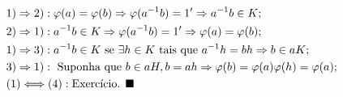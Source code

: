 \documentclass[algebra_notes.tex]{subfiles}
\begin{document}
\begin{proof*}
	\begin{align*}
		 & 1)\Rightarrow2): \varphi(a) = \varphi(b) \Rightarrow \varphi(a^{-1}b) = 1' \Rightarrow a^{-1}b\in K;             \\
		 & 2)\Rightarrow1): a^{-1}b\in K \Rightarrow \varphi(a^{-1}b) = 1' \Rightarrow \varphi(a)=\varphi(b);               \\
		 & 1)\Rightarrow3): a^{-1}b\in K \text{ se } \exists h\in K \text{ tais que } a^{-1}h = bh \Rightarrow b\in aK;     \\
		 & 3)\Rightarrow1): \text{ Suponha que }b\in aH, b = ah \Rightarrow \varphi(b) = \varphi(a)\varphi(h) = \varphi(a); \\
		 & (1)\Longleftrightarrow(4): \text{Exercício. $\blacksquare$}
	\end{align*}
\end{proof*}
\end{document}

